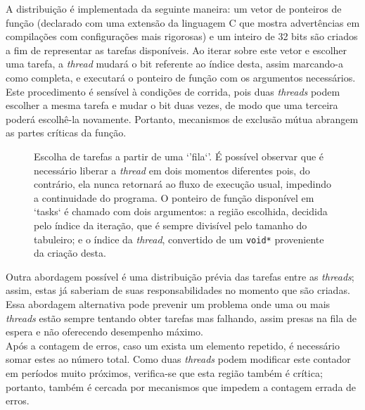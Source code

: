 \documentclass[12pt]{article}
\begin{document}
A distribuição é implementada da seguinte maneira: um vetor de ponteiros de
função (declarado com uma extensão da linguagem C que mostra advertências em
compilações com configurações mais rigorosas) e um inteiro de 32 bits são
criados a fim de representar as tarefas disponíveis. Ao iterar sobre este vetor
e escolher uma tarefa, a \emph{thread} mudará o bit referente ao índice desta,
assim marcando-a como completa, e executará o ponteiro de função com os
argumentos necessários.  Este procedimento é sensível à condições de corrida,
pois duas \emph{threads} podem escolher a mesma tarefa e mudar o bit duas
vezes, de modo que uma terceira poderá escolhê-la novamente. Portanto,
mecanismos de exclusão mútua abrangem as partes críticas da função.

\begin{figure}[htbp]
  
  \caption{Escolha de tarefas a partir de uma `'fila`'. É possível observar
    que é necessário liberar a \emph{thread} em dois momentos diferentes
    pois, do contrário, ela nunca retornará ao fluxo de execução usual,
    impedindo a continuidade do programa. O ponteiro de função disponível em
    `tasks` é chamado com dois argumentos: a região escolhida, decidida pelo
    índice da iteração, que é sempre divisível pelo tamanho do tabuleiro; e
    o índice da \emph{thread}, convertido de um \texttt{void*} proveniente
    da criação desta.}
\end{figure}

Outra abordagem possível é uma distribuição prévia das tarefas entre as
\emph{threads}; assim, estas já saberiam de suas responsabilidades no momento
que são criadas.  Essa abordagem alternativa pode prevenir um problema onde uma
ou mais \emph{threads} estão sempre tentando obter tarefas mas falhando, assim
presas na fila de espera e não oferecendo desempenho máximo. \\

Após a contagem de erros, caso um exista um elemento repetido, é necessário
somar estes ao número total. Como duas \emph{threads} podem modificar este
contador em períodos muito próximos, verifica-se que esta região também é
crítica; portanto, também é cercada por mecanismos que impedem a contagem
errada de erros.



\end{document}
